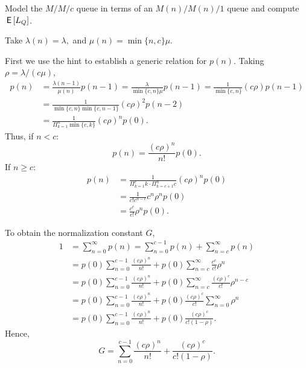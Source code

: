 \begin{exercise}
 Model the $M/M/c$ queue in terms of an $M(n)/M(n)/1$ queue and compute $\,\mathsf{E}\left[L_Q\right]$. 
\begin{hint}
Take $\lambda(n) = \lambda,$ and $\mu(n) = \min\{n, c\} \mu$. 
\end{hint}
\begin{solution}
First we use the hint to establish a generic relation for $p(n)$. Taking $\rho=\lambda/(c\mu)$, 
 \begin{align*}
 p(n) 
 &= \frac{\lambda(n-1)}{\mu(n)}p(n-1) 
 = \frac{\lambda}{\min\{c, n\} \mu }p(n-1) 
 = \frac{1}{\min\{c, n\}}(c\rho) p(n-1) \\
 & = \frac{1}{\min\{c, n\}\min\{c, n-1\}}(c\rho)^2 p(n-2) \\
 &= \frac{1}{\Pi_{k=1}^{n}\min\{c, k\}}(c\rho)^{n} p(0). 
 \end{align*}
Thus, if $n<c$:
\begin{equation}
 p(n)
 = \frac{(c\rho)^n}{n!} p(0).
\end{equation}
If $n\geq c$:
\begin{align*}
 p(n) 
&= \frac{1}{\Pi_{k=1}^{c} k \cdot \Pi_{k=c+1}^{n} c}(c\rho)^{n} p(0) \\
&= \frac{1}{c! c^{n-c}}c^n\rho^{n} p(0) \\
&= \frac{c^c}{c!}\rho^{n} p(0).
\end{align*}


To obtain the normalization constant $G$,
\begin{align*}
1 &= \sum_{n=0}^\infty p(n) 
= \sum_{n=0}^{c-1} p(n) + \sum_{n=c}^\infty p(n) \\
&=p(0) \sum_{n=0}^{c-1}\frac{(c\rho)^n}{n!} + 
 p(0)\sum_{n=c}^{\infty} \frac{c^c}{c!} \rho^{n} \\
&=p(0)\sum_{n=0}^{c-1}\frac{(c\rho)^n}{n!} + 
 p(0) \sum_{n=c}^{\infty} \frac{(c\rho)^c}{c!} \rho^{n-c} \\
&= 
p(0)\sum_{n=0}^{c-1}\frac{(c\rho)^n}{n!} + 
p(0)\frac{(c\rho)^c}{c!} \sum_{n=0}^{\infty} \rho^n \\
&= 
p(0) \sum_{n=0}^{c-1}\frac{(c\rho)^n}{n!} + 
p(0)\frac{(c\rho)^c}{c!(1-\rho)}.
\end{align*}
Hence, 
\begin{equation}\label{eq:501}
 G= \sum_{n=0}^{c-1}\frac{(c\rho)^n}{n!} + \frac{(c\rho)^c}{c!(1-\rho)}.
\end{equation}


\end{solution}
\end{exercise}
